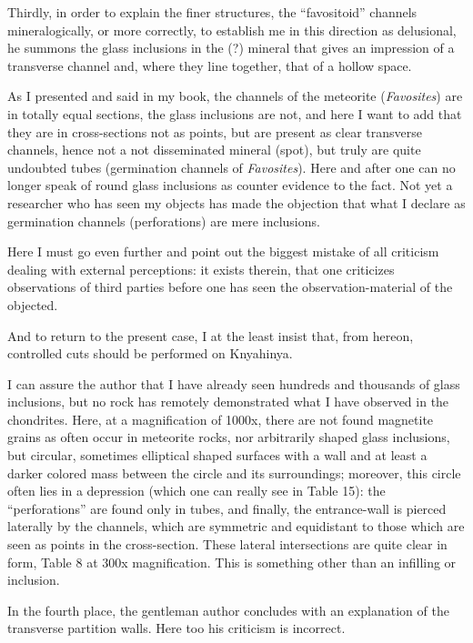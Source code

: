 \documentclass[a4paper, 12pt, oneside]{article}
\begin{document}
Thirdly, in order to explain the finer structures, the ``favositoid'' channels mineralogically, or more correctly, to establish me in this direction as delusional, he summons the glass inclusions in the (?) mineral that gives an impression of a transverse channel and, where they line together, that of a hollow space.

As I presented and said in my book, the channels of the meteorite (\emph{Favosites}) are in totally equal sections, the glass inclusions are not, and here I want to add that they are in cross-sections not as points, but are present as clear transverse channels, hence not a not disseminated mineral (spot), but truly are quite undoubted tubes (germination channels of \emph{Favosites}). Here and after one can no longer speak of round glass inclusions as counter evidence to the fact. Not yet a researcher who has seen my objects has made the objection that what I declare as germination channels (perforations) are mere inclusions.

Here I must go even further and point out the biggest mistake of all criticism dealing with external perceptions: it exists therein, that one criticizes observations of third parties before one has seen the observation-material of the objected.

And to return to the present case, I at the least insist that, from hereon, controlled cuts should be performed on Knyahinya.

I can assure the author that I have already seen hundreds and thousands of glass inclusions, but no rock has remotely demonstrated what I have observed in the chondrites. Here, at a magnification of 1000x, there are not found magnetite grains as often occur in meteorite rocks, nor arbitrarily shaped glass inclusions, but circular, sometimes elliptical shaped surfaces with a wall and at least a darker colored mass between the circle and its surroundings; moreover, this circle often lies in a depression (which one can really see in Table 15): the ``perforations'' are found only in tubes, and finally, the entrance-wall is pierced laterally by the channels, which are symmetric and equidistant to those which are seen as points in the cross-section. These lateral intersections are quite clear in form, Table 8 at 300x magnification. This is something other than an infilling or inclusion.

In the fourth place, the gentleman author concludes with an explanation of the transverse partition walls. Here too his criticism is incorrect.
\end{document}

